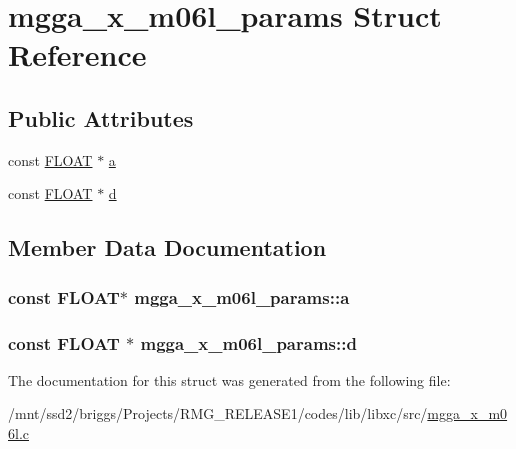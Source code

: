 \hypertarget{structmgga__x__m06l__params}{\section{mgga\-\_\-x\-\_\-m06l\-\_\-params Struct Reference}
\label{structmgga__x__m06l__params}
}
\subsection*{Public Attributes}
\begin{DoxyCompactItemize}
\item 
const \hyperlink{src_2xc__config_8h_ae8690abbffa85934d64d545920e2b108}{F\-L\-O\-A\-T} $\ast$ \hyperlink{structmgga__x__m06l__params_a817bf2c04a42ddfa94b011b1e66d2246}{a}
\item 
const \hyperlink{src_2xc__config_8h_ae8690abbffa85934d64d545920e2b108}{F\-L\-O\-A\-T} $\ast$ \hyperlink{structmgga__x__m06l__params_af6c32eb7c9473ae55e99bf92c232eebf}{d}
\end{DoxyCompactItemize}


\subsection{Member Data Documentation}
\hypertarget{structmgga__x__m06l__params_a817bf2c04a42ddfa94b011b1e66d2246}{
\subsubsection[{a}]{\setlength{\rightskip}{0pt plus 5cm}const {\bf F\-L\-O\-A\-T}$\ast$ mgga\-\_\-x\-\_\-m06l\-\_\-params\-::a}}\label{structmgga__x__m06l__params_a817bf2c04a42ddfa94b011b1e66d2246}
\hypertarget{structmgga__x__m06l__params_af6c32eb7c9473ae55e99bf92c232eebf}{
\subsubsection[{d}]{\setlength{\rightskip}{0pt plus 5cm}const {\bf F\-L\-O\-A\-T} $\ast$ mgga\-\_\-x\-\_\-m06l\-\_\-params\-::d}}\label{structmgga__x__m06l__params_af6c32eb7c9473ae55e99bf92c232eebf}


The documentation for this struct was generated from the following file\-:\begin{DoxyCompactItemize}
\item 
/mnt/ssd2/briggs/\-Projects/\-R\-M\-G\-\_\-\-R\-E\-L\-E\-A\-S\-E1/codes/lib/libxc/src/\hyperlink{mgga__x__m06l_8c}{mgga\-\_\-x\-\_\-m06l.\-c}\end{DoxyCompactItemize}
